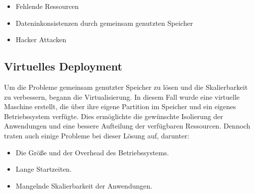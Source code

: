 \begin{itemize}
    \item Fehlende Ressourcen
    \item Dateninkonsistenzen durch gemeinsam genutzten Speicher
    \item Hacker Attacken
\end{itemize}


\cite{Verschiedene_Deployment_Arten}    


\subsection{Virtuelles Deployment}

Um die Probleme gemeinsam genutzter Speicher zu lösen und die Skalierbarkeit zu verbessern, begann die Virtualisierung. In diesem Fall wurde eine virtuelle Maschine erstellt, die über ihre eigene Partition im Speicher und ein eigenes Betriebssystem verfügte. Dies ermöglichte die gewünschte Isolierung der Anwendungen und eine bessere Aufteilung der verfügbaren Ressourcen. Dennoch traten auch einige Probleme bei dieser Lösung auf, darunter:

\begin{itemize}
\item Die Größe und der Overhead des Betriebssystems.
\item  Lange Startzeiten.
\item  Mangelnde Skalierbarkeit der Anwendungen.
\end{itemize}

\cite{Virtuelles_Deployment}
